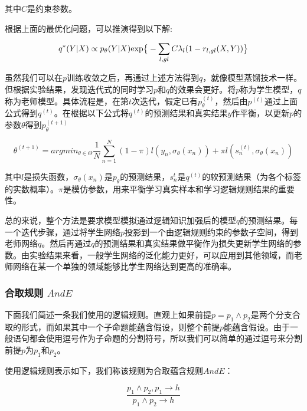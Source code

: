 \documentclass[UTF8,11pt,a4paper,nofonts]{ctexart}
\begin{document}
其中$C$是约束参数。

根据上面的最优化问题，可以推演得到以下解\cite{Hu2016HarnessingDN}:

\begin{equation}
q^*(Y|X) \propto p_\theta(Y|X) \text{exp} \big{\{} -\sum_{l,gl}C\lambda_l(1-r_{l,gl}(X,Y)) \big{\}}
\end{equation}

虽然我们可以在$p$训练收敛之后，再通过上述方法得到$q$，就像模型蒸馏技术\cite{Hinton2015DistillingTK, LopezPaz2015UnifyingDA}一样。但根据实验结果，发现迭代式的同时学习$p$和$q$的效果会更好。\cite{Hu2016HarnessingDN}将$p$称为学生模型，$q$称为老师模型。具体流程是，在第$t$次迭代，假定已有$p_\theta^{(t)}$，然后由$p^{(t)}$通过上面公式得到$q^{(t)}$。在根据以下公式将$q^{(t)}$的预测结果和真实结果$y$作平衡，以更新$p$的参数$\theta$得到$p_\theta^{(t+1)}$

\begin{equation}
\theta^{(t+1)} = argmin_{\theta\in \Theta} \frac{1}{N}\sum^N_{n=1}(1-\pi)l(y_n,\sigma_\theta(x_n)) + \pi l(s^{(t)}_n,\sigma_\theta(x_n)) 
\end{equation}

其中$l$是损失函数，$\sigma_\theta(x_n)$是$p_\theta$的预测结果，$s_n^{t}$是$q^{(t)}$的软预测结果（为各个标签的实数概率）。$\pi$是模仿参数，用来平衡学习真实样本和学习逻辑规则结果的重要性。

总的来说，整个方法是要求模型模拟通过逻辑知识加强后的模型$q$的预测结果。每一个迭代步骤，通过将学生网络$p$投影到一个由逻辑规则约束的参数子空间，得到老师网络$q$。然后再通过$q$的预测结果和真实结果做平衡作为损失更新学生网络的参数。由实验结果来看，一般学生网络的泛化能力更好，可以应用到其他领域，而老师网络在某一个单独的领域能够比学生网络达到更高的准确率。

\subsubsection{合取规则 $AndE$}

下面我们简述一条我们使用的逻辑规则。直观上如果前提$p=p_1 \land p_2$是两个分支合取的形式，而如果其中一个子命题能蕴含假设，则整个前提$p$能蕴含假设。由于一般语句都会使用逗号作为子命题的分割符号，所以我们可以简单的通过逗号来分割前提$p$为$p_1$和$p_2$。

使用逻辑规则表示如下，我们称该规则为合取蕴含规则$AndE$：

\begin{equation}
\frac{p_1 \land p_2, p_1 \to h}{p_1 \land p_2 \to h}
\end{equation}
\end{document}
